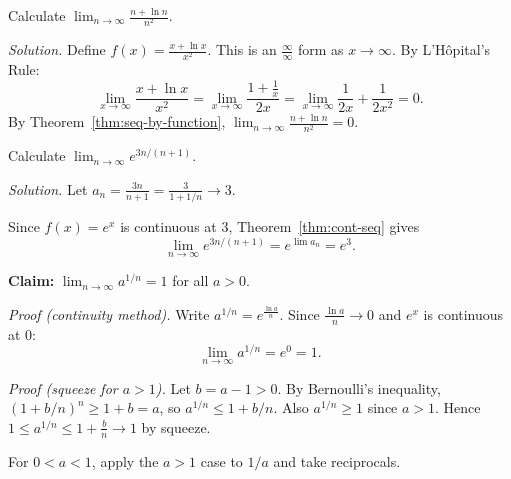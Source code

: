 \begin{examplebox}[title={Worked Example (Lecture Example 4.14): L'H\^opital via the function bridge}]

Calculate $\displaystyle \lim_{n\to\infty}\frac{n+\ln n}{n^2}$.

\emph{Solution.}
Define $f(x)=\frac{x+\ln x}{x^2}$. This is an $\frac{\infty}{\infty}$ form as $x\to\infty$. By L'H\^opital's Rule:
\[
\lim_{x\to\infty}\frac{x+\ln x}{x^2}
=\lim_{x\to\infty}\frac{1+\frac{1}{x}}{2x}
=\lim_{x\to\infty}\frac{1}{2x}+\frac{1}{2x^2}=0.
\]
By Theorem~\ref{thm:seq-by-function}, $\boxed{\lim_{n\to\infty}\frac{n+\ln n}{n^2}=0}$.

\end{examplebox}

\begin{examplebox}[title={Worked Example (Lecture Example 4.15): composing function bridge with continuity}]

Calculate $\displaystyle \lim_{n\to\infty}e^{3n/(n+1)}$.

\emph{Solution.}
Let $a_n=\frac{3n}{n+1}=\frac{3}{1+1/n}\to 3$.

Since $f(x)=e^x$ is continuous at $3$, Theorem~\ref{thm:cont-seq} gives
\[
\lim_{n\to\infty}e^{3n/(n+1)}=e^{\lim a_n}=\boxed{e^3}.
\]

\end{examplebox}

\begin{examplebox}[title={Worked Example (Tutorial 7, Q5): $\sqrt[n]{a}\to 1$ for $a>0$}]

\textbf{Claim:} $\displaystyle \lim_{n\to\infty}a^{1/n}=1$ for all $a>0$.

\emph{Proof (continuity method).}
Write $a^{1/n}=e^{\frac{\ln a}{n}}$. Since $\frac{\ln a}{n}\to 0$ and $e^x$ is continuous at $0$:
\[
\lim_{n\to\infty}a^{1/n}=e^0=1.
\]

\emph{Proof (squeeze for $a>1$).}
Let $b=a-1>0$. By Bernoulli's inequality, $(1+b/n)^n\ge 1+b=a$, so $a^{1/n}\le 1+b/n$.
Also $a^{1/n}\ge 1$ since $a>1$. Hence $1\le a^{1/n}\le 1+\frac{b}{n}\to 1$ by squeeze.

For $0<a<1$, apply the $a>1$ case to $1/a$ and take reciprocals.

\end{examplebox}


